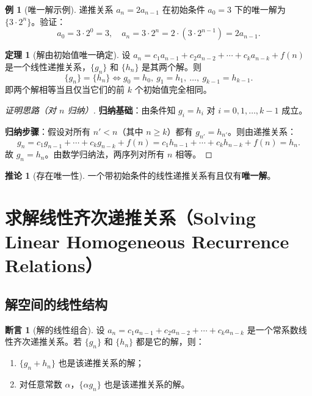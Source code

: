 \documentclass[UTF8,11pt,a4paper]{ctexbook}   %
\theoremstyle{definition}
\newtheorem{theorem}{定理}[section]
\newtheorem{example}{例}[section]
\newtheorem{proposition}{断言}[section]
\newtheorem{corollary}{推论}[section]
\begin{document}
\begin{example}[唯一解示例]
递推关系 $a_n = 2a_{n-1}$ 在初始条件 $a_0 = 3$ 下的唯一解为 $\{3 \cdot 2^n\}$。验证：
\[
a_0 = 3 \cdot 2^0 = 3,\quad a_n = 3 \cdot 2^n = 2 \cdot (3 \cdot 2^{n-1}) = 2a_{n-1}.
\]
\end{example}

\begin{theorem}[解由初始值唯一确定]
设 $a_n = c_1 a_{n-1} + c_2 a_{n-2} + \cdots + c_k a_{n-k} + f(n)$ 是一个线性递推关系，$\{g_n\}$ 和 $\{h_n\}$ 是其两个解。则
\[
\{g_n\} = \{h_n\} \iff g_0 = h_0,\ g_1 = h_1,\ \dots,\ g_{k-1} = h_{k-1}.
\]
即两个解相等当且仅当它们的前 $k$ 个初始值完全相同。
\end{theorem}

\begin{proof}[证明思路（对 $n$ 归纳）]
\textbf{归纳基础}：由条件知 $g_i = h_i$ 对 $i = 0,1,\dots,k-1$ 成立。

\textbf{归纳步骤}：假设对所有 $n' < n$（其中 $n \ge k$）都有 $g_{n'} = h_{n'}$。则由递推关系：
\[
g_n = c_1 g_{n-1} + \cdots + c_k g_{n-k} + f(n) = c_1 h_{n-1} + \cdots + c_k h_{n-k} + f(n) = h_n.
\]
故 $g_n = h_n$。由数学归纳法，两序列对所有 $n$ 相等。
\end{proof}

\begin{corollary}[存在唯一性]
一个带初始条件的线性递推关系有且仅有\textbf{唯一解}。
\end{corollary}

\section{求解线性齐次递推关系（Solving Linear Homogeneous Recurrence Relations）}

\subsection{解空间的线性结构}

\begin{proposition}[解的线性组合]
设 $a_n = c_1 a_{n-1} + c_2 a_{n-2} + \cdots + c_k a_{n-k}$ 是一个常系数线性齐次递推关系。若 $\{g_n\}$ 和 $\{h_n\}$ 都是它的解，则：
\begin{enumerate}
    \item $\{g_n + h_n\}$ 也是该递推关系的解；
    \item 对任意常数 $\alpha$，$\{\alpha g_n\}$ 也是该递推关系的解。
\end{enumerate}
\end{proposition}
\end{document}
